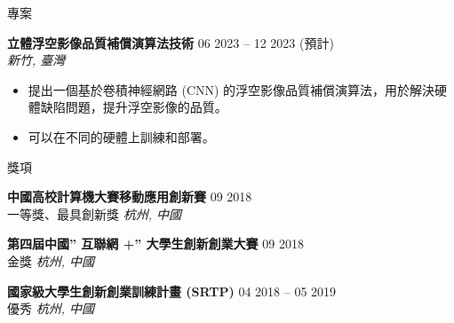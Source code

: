 \documentclass{resume}
\begin{document}
\begin{rSection}{專案}
    \item \textbf{立體浮空影像品質補償演算法技術} \hfill {06 2023 -- 12 2023 (預計)}\\
    \mbox{} \hfill \textit{新竹, 臺灣}
    \vspace{-0.5em}
    \begin{itemize}
        \item 提出一個基於卷積神經網路 (CNN) 的浮空影像品質補償演算法，用於解決硬體缺陷問題，提升浮空影像的品質。
        \item 可以在不同的硬體上訓練和部署。
    \end{itemize}
\end{rSection} 

\vspace{-1em}
\begin{rSection}{獎項}
\vspace{-1.25em}
    \item \textbf{中國高校計算機大賽移動應用創新賽} \hfill {09 2018}\\
    {一等獎、最具創新獎} \hfill \textit{杭州, 中國}

    \item \textbf{第四屆中國” 互聯網 +” 大學生創新創業大賽} \hfill {09 2018}\\
    {金獎} \hfill \textit{杭州, 中國}

    \item \textbf{國家級大學生創新創業訓練計畫 (SRTP)} \hfill {04 2018 -- 05 2019}\\
    {優秀} \hfill \textit{杭州, 中國}
\end{rSection} 


\end{document}
